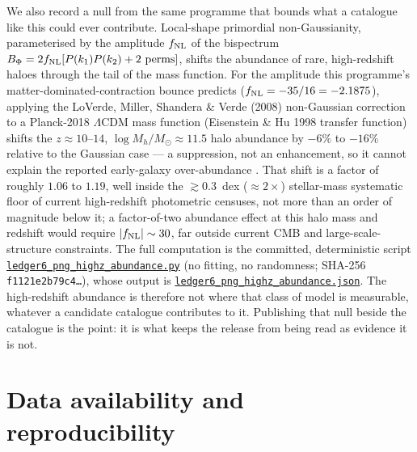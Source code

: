 \documentclass[aps,prd,twocolumn,superscriptaddress,nofootinbib,longbibliography,floatfix]{revtex4-2}
\newcommand{\repoSHA}{main}
\newcommand{\artifactlink}[2]{\href{https://github.com/Hubify-Projects/bigbounce/blob/\repoSHA/#1}{\texttt{#2}}}
\begin{document}
We also record a null from the same programme that bounds what a catalogue
like this could ever contribute. Local-shape primordial non-Gaussianity,
parameterised by the amplitude $f_{\rm NL}$ of the bispectrum
$B_\Phi = 2f_{\rm NL}[P(k_1)P(k_2)+2\ \mathrm{perms}]$, shifts the abundance
of rare, high-redshift haloes through the tail of the mass function. For the
amplitude this programme's matter-dominated-contraction bounce predicts
($f_{\rm NL}=-35/16=-2.1875$), applying the LoVerde, Miller, Shandera \&
Verde (2008) \cite{LoVerde2008} non-Gaussian correction to a Planck-2018
\cite{Planck2018} $\Lambda$CDM mass function (Eisenstein \& Hu 1998
\cite{EisensteinHu1998} transfer function) shifts the $z\approx
10$--$14$, $\log M_h/M_\odot\approx11.5$ halo abundance by $-6\%$ to $-16\%$
relative to the Gaussian case --- a suppression, not an enhancement, so it
cannot explain the reported early-galaxy over-abundance
\cite{Labbe2023,BoylanKolchin2023}. That shift is a factor of roughly $1.06$
to $1.19$, well inside the $\gtrsim0.3$~dex ($\approx2\times$) stellar-mass
systematic floor of current high-redshift photometric censuses, not more
than an order of magnitude below it; a factor-of-two abundance effect at
this halo mass and redshift would require $|f_{\rm NL}|\sim30$, far outside
current CMB and large-scale-structure constraints. The full computation is
the committed, deterministic script
\artifactlink{research/anomaly_map/ledger6_png_highz_abundance.py}{ledger6\_png\_highz\_abundance.py}
(no fitting, no randomness; SHA-256 \texttt{f1121e2b79c4\ldots}), whose output
is \artifactlink{research/anomaly_map/outputs/ledger6_png_highz_abundance.json}{ledger6\_png\_highz\_abundance.json}.
The high-redshift abundance is therefore not where that class of model is
measurable, whatever a candidate catalogue contributes to it. Publishing that
null beside the catalogue is the point: it is what keeps the release from
being read as evidence it is not.

\section{Data availability and reproducibility}
\label{sec:repro}
\end{document}

